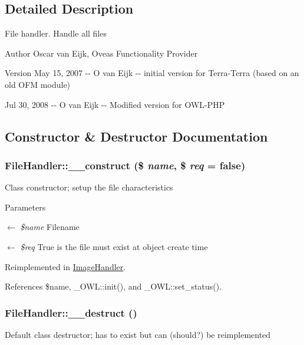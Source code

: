 \subsection{Detailed Description}
File handler. Handle all files \begin{DoxyAuthor}{Author}
Oscar van Eijk, Oveas Functionality Provider 
\end{DoxyAuthor}
\begin{DoxyVersion}{Version}
May 15, 2007 -\/-\/ O van Eijk -\/-\/ initial version for Terra-\/Terra (based on an old OFM module) 

Jul 30, 2008 -\/-\/ O van Eijk -\/-\/ Modified version for OWL-\/PHP 
\end{DoxyVersion}


\subsection{Constructor \& Destructor Documentation}
\subsubsection[{\_\-\_\-construct}]{\setlength{\rightskip}{0pt plus 5cm}FileHandler::\_\-\_\-construct (\$ {\em name}, \/  \$ {\em req} = {\ttfamily false})}\label{classFileHandler_a8d75c8ea0c532acdeae0a0a4efa3704a}
Class constructor; setup the file characteristics


\begin{DoxyParams}{Parameters}
\item[\mbox{$\leftarrow$} {\em \$name}]Filename \item[\mbox{$\leftarrow$} {\em \$req}]True is the file must exist at object create time \end{DoxyParams}


Reimplemented in \hyperlink{classImageHandler_aa61dc81d4cf98eed31b32e2197018309}{ImageHandler}.



References \$name, \_\-OWL::init(), and \_\-OWL::set\_\-status().

\subsubsection[{\_\-\_\-destruct}]{\setlength{\rightskip}{0pt plus 5cm}FileHandler::\_\-\_\-destruct ()}\label{classFileHandler_a734859e8962992da99dd8f853da5ae43}
Default class destructor; has to exist but can (should?) be reimplemented 

